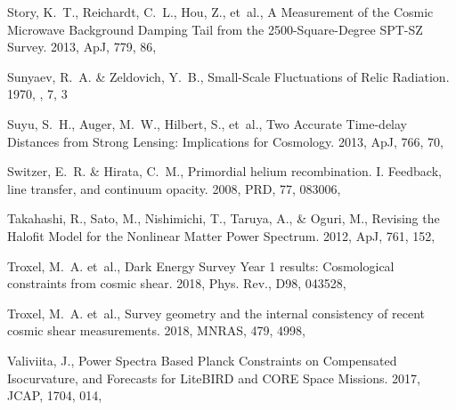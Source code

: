 \documentclass[longauth,traditabstract]{aa}
\def\apj{{ApJ}}
\def\mnras{{MNRAS}}
\def\prd{{PRD}}
\def\jcap{{JCAP}}
\begin{document}
\begin{thebibliography}{379}
{Story}, K.~T., {Reichardt}, C.~L., {Hou}, Z., {et~al.}, {A Measurement of the
  Cosmic Microwave Background Damping Tail from the 2500-Square-Degree SPT-SZ
  Survey}. 2013, \apj, 779, 86, 

{Sunyaev}, R.~A. \& {Zeldovich}, Y.~B., {Small-Scale Fluctuations of Relic
  Radiation}. 1970, \apss, 7, 3

{Suyu}, S.~H., {Auger}, M.~W., {Hilbert}, S., {et~al.}, {Two Accurate
  Time-delay Distances from Strong Lensing: Implications for Cosmology}. 2013,
  \apj, 766, 70, 

{Switzer}, E.~R. \& {Hirata}, C.~M., {Primordial helium recombination. I.
  Feedback, line transfer, and continuum opacity}. 2008, \prd, 77, 083006,

Takahashi, R., Sato, M., Nishimichi, T., Taruya, A., \& Oguri, M., {Revising
  the Halofit Model for the Nonlinear Matter Power Spectrum}. 2012, \apj, 761,
  152, 

Troxel, M.~A. {et~al.}, {Dark Energy Survey Year 1 results: Cosmological
  constraints from cosmic shear}. 2018{}, Phys. Rev., D98, 043528,

Troxel, M.~A. {et~al.}, {Survey geometry and the internal consistency of recent
  cosmic shear measurements}. 2018{}, \mnras, 479, 4998,

Valiviita, J., {Power Spectra Based Planck Constraints on Compensated
  Isocurvature, and Forecasts for LiteBIRD and CORE Space Missions}. 2017,
  \jcap, 1704, 014, 


\end{thebibliography}
\end{document}
